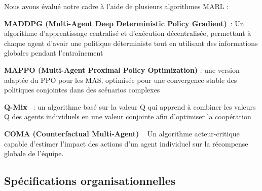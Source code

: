 Nous avons évalué notre cadre à l'aide de plusieurs algorithmes MARL :
%
\begin{enumerate*}[label={\roman*) },itemjoin={; \quad}]

    \item \textbf{MADDPG (Multi-Agent Deep Deterministic Policy Gradient)}~\cite{lowe2017multi}: Un algorithme d'apprentissage centralisé et d'exécution décentralisée, permettant à chaque agent d'avoir une politique déterministe tout en utilisant des informations globales pendant l'entraînement



    \item \textbf{MAPPO (Multi-Agent Proximal Policy Optimization)} \cite{yu2021mappo} : une version adaptée du PPO pour les MAS, optimisée pour une convergence stable des politiques conjointes dans des scénarios complexes



    \item \textbf{Q-Mix}~\cite{rashid2018qmix} : un algorithme basé sur la valeur Q qui apprend à combiner les valeurs Q des agents individuels en une valeur conjointe afin d'optimiser la coopération



    \item \textbf{COMA (Counterfactual Multi-Agent) }~\cite{foerster2018counterfactual} Un algorithme acteur-critique capable d'estimer l'impact des actions d'un agent individuel sur la récompense globale de l'équipe.
\end{enumerate*}

\subsection{Spécifications organisationnelles}

